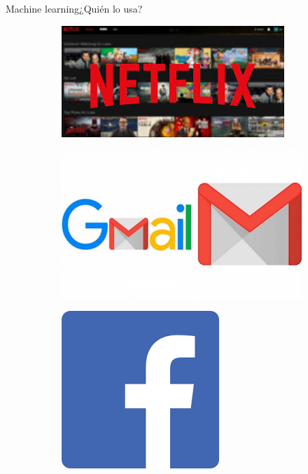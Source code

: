 \documentclass[10pt,xcolor={dvipsnames}]{beamer}
\begin{document}
\begin{frame}{Machine learning}{¿Quién lo usa?}
\begin{figure}[ht]
	\begin{subfigure}{0.5\textwidth}
		\includegraphics[scale=0.5]{img/netflix}
	\end{subfigure}
	\begin{subfigure}{0.5\textwidth}
		\includegraphics[scale=0.15]{img/gmail}	
	\end{subfigure}
	\begin{subfigure}{0.5\textwidth}
		\includegraphics[scale=0.25]{img/facebook}
	\end{subfigure}
\end{figure}
\end{frame}
\end{document}
